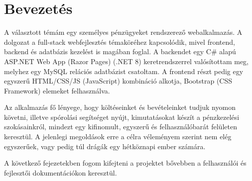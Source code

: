 \chapter{Bevezetés}
\label{ch:intro}

A választott témám egy személyes pénzügyeket rendszerező webalkalmazás. A dolgozat a full-stack webfejlesztés témaköréhez kapcsolódik, mivel frontend, backend és adatbázis kezelést is magában foglal. A backendet egy C\# alapú ASP.NET Web App (Razor Pages) (.NET 8) keretrendszerrel valósítottam meg, melyhez egy MySQL relációs adatbázist csatoltam. A frontend részt pedig egy egyszerű HTML/CSS/JS (JavaScript) kombináció alkotja, Bootstrap (CSS Framework) elemeket felhasználva.

Az alkalmazás fő lényege, hogy költéseinket és bevételeinket tudjuk nyomon követni, illetve spórolási segítséget nyújt, kimutatásokat készít a pénzkezelési szokásainkról, mindezt egy kifinomult, egyszerű és felhasználóbarát felületen keresztül. A jelenlegi megoldások erre a célra véleményem szerint nem elég egyszerűek, vagy pedig túl drágák egy hétköznapi ember számára.

A következő fejezetekben fogom kifejteni a projektet bővebben a felhasználói és fejlesztői dokumentációkon keresztül.
